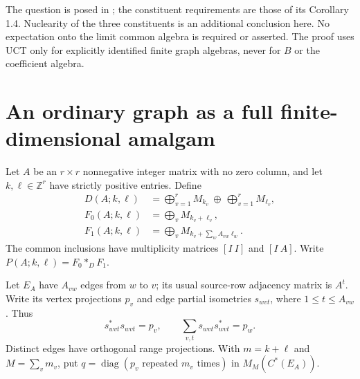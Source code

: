 \documentclass[11pt]{article}
\theoremstyle{remark}\newtheorem{remark}[theorem]{Remark}
\newcommand{\Z}{\mathbb Z}\newcommand{\C}{\mathbb C}
\begin{document}
The question is posed in \cite[Remark 1.5, p.~2]{Suzuki}; the constituent
requirements are those of its Corollary 1.4. Nuclearity of the three
constituents is an additional conclusion here. No expectation onto the
limit common algebra is required or asserted. The proof uses UCT only
for explicitly identified finite graph algebras, never for $B$ or the
coefficient algebra.

\section{An ordinary graph as a full finite-dimensional amalgam}
Let $A$ be an $r\times r$ nonnegative integer matrix with no zero column,
and let $k,\ell\in\Z^r$ have strictly positive entries. Define
\begin{align*}
 D(A;k,\ell)&=\bigoplus_{v=1}^rM_{k_v}\ \oplus\ \bigoplus_{v=1}^rM_{\ell_v},\\
 F_0(A;k,\ell)&=\bigoplus_vM_{k_v+\ell_v},\\
 F_1(A;k,\ell)&=\bigoplus_vM_{k_v+\sum_w A_{vw}\ell_w}.
\end{align*}
The common inclusions have multiplicity matrices $[I\ I]$ and $[I\ A]$.
Write $P(A;k,\ell)=F_0*_{D}F_1$.

Let $E_A$ have $A_{vw}$ edges from $w$ to $v$; its usual source-row
adjacency matrix is $A^t$. Write its vertex projections $p_v$ and edge
partial isometries $s_{wvt}$, where $1\le t\le A_{vw}$. Thus
\[
 s_{wvt}^*s_{wvt}=p_v,\qquad
 \sum_{v,t}s_{wvt}s_{wvt}^*=p_w.
\]
Distinct edges have orthogonal range projections. With $m=k+\ell$ and
$M=\sum_vm_v$, put $q=\operatorname{diag}(p_v\text{ repeated }m_v\text{ times})$
in $M_M(C^*(E_A))$.
\end{document}

